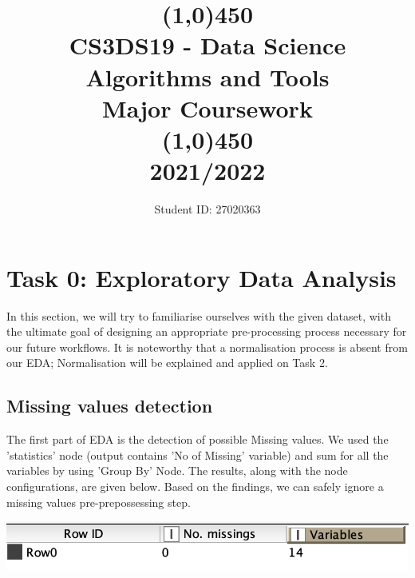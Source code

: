 \documentclass[11pt]{article}
\title{\line(1,0){450}\\ CS3DS19 - Data Science Algorithms and Tools \\ \large{Major Coursework }  \\\line(1,0){450} \\2021/2022}
\author{Student ID: 27020363}
\begin{document}
	\maketitle
	\pagebreak
	
	\section*{Task 0: Exploratory Data Analysis}
		In this section, we will try to familiarise ourselves with the given dataset, with the ultimate goal of designing an appropriate pre-processing process necessary for our future workflows. It is noteworthy that a normalisation process is absent from our EDA; Normalisation will be explained and applied on Task 2.
		\subsection*{Missing values detection}
			The first part of EDA is the detection of possible Missing values. We used the 'statistics' node (output contains 'No of Missing' variable) and sum for all the variables by using 'Group By' Node. The results, along with the node configurations, are given below. Based on the findings, we can safely ignore a missing values pre-prepossessing step.
			\iftrue
			\begin{center}
				\includegraphics[scale=0.5]{res/t0/t01/t01-missing-values-res}
			\end{center}
			\fi
\end{document}
